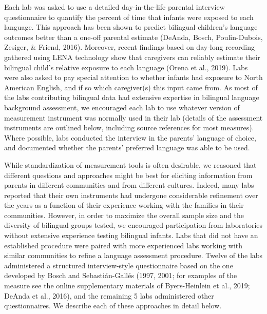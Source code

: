 \documentclass[,man,floatsintext]{apa6}
\begin{document}
Each lab was asked to use a detailed day-in-the-life parental interview questionnaire to quantify the percent of time that infants were exposed to each language. This approach has been shown to predict bilingual children's language outcomes better than a one-off parental estimate (DeAnda, Bosch, Poulin-Dubois, Zesiger, \& Friend, 2016). Moreover, recent findings based on day-long recording gathered using LENA technology show that caregivers can reliably estimate their bilingual child's relative exposure to each language (Orena et al., 2019). Labs were also asked to pay special attention to whether infants had exposure to North American English, and if so which caregiver(s) this input came from. As most of the labs contributing bilingual data had extensive expertise in bilingual language background assessment, we encouraged each lab to use whatever version of measurement instrument was normally used in their lab (details of the assessment instruments are outlined below, including source references for most measures). Where possible, labs conducted the interview in the parents' language of choice, and documented whether the parents' preferred language was able to be used.

While standardization of measurement tools is often desirable, we reasoned that different questions and approaches might be best for eliciting information from parents in different communities and from different cultures. Indeed, many labs reported that their own instruments had undergone considerable refinement over the years as a function of their experience working with the families in their communities. However, in order to maximize the overall sample size and the diversity of bilingual groups tested, we encouraged participation from laboratories without extensive experience testing bilingual infants. Labs that did not have an established procedure were paired with more experienced labs working with similar communities to refine a language assessment procedure. Twelve of the labs administered a structured interview-style questionnaire based on the one developed by Bosch and Sebastián-Gallés (1997, 2001; for examples of the measure see the online supplementary materials of Byers-Heinlein et al., 2019; DeAnda et al., 2016), and the remaining 5 labs administered other questionnaires. We describe each of these approaches in detail below.
\end{document}
